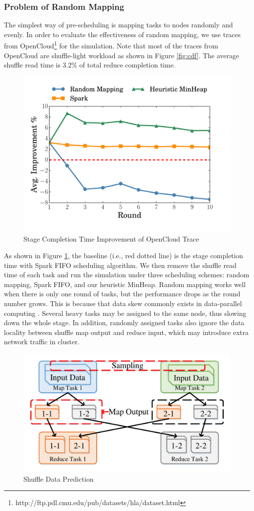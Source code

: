 \subsubsection{Problem of Random Mapping}\label{randomassign}
The simplest way of pre-scheduling is mapping tasks to nodes randomly and evenly. 
In order to evaluate the effectiveness of random mapping, we use traces from OpenCloud\footnote{\label{fn:trace}http://ftp.pdl.cmu.edu/pub/datasets/hla/dataset.html} for the simulation.
Note that most of the traces from OpenCloud are shuffle-light workload as shown in Figure \ref{fig:cdf}. 
The average shuffle read time is $3.2\%$ of total reduce completion time.
\begin{figure}
	\centering
	\includegraphics[width=0.66\linewidth]{fig/sim}
	\caption{Stage Completion Time Improvement of OpenCloud Trace}
	\label{fig:sim}
	\vspace{-1em}
\end{figure}
As shown in Figure \ref{fig:sim}, the baseline (i.e., red dotted line) is the stage completion time with Spark FIFO scheduling algorithm. 
We then remove the shuffle read time of each task and run the simulation under three scheduling schemes: random mapping, Spark FIFO, and our heuristic MinHeap.
Random mapping works well when there is only one round of tasks, but the performance drops as the round number grows. 
This is because that data skew commonly exists in data-parallel computing \cite{skewtune, reining, gufler2012load}. 
Several heavy tasks may be assigned to the same node, thus slowing down the whole stage. 
In addition, randomly assigned tasks also ignore the data locality between shuffle map output and reduce input, which may introduce extra network traffic in cluster.
\begin{figure}
	\centering
	\includegraphics[width=0.75\linewidth]{fig/shuffle}
	\caption{Shuffle Data Prediction}
	\label{fig:shuffle}
	\vspace{-1em}
\end{figure}
